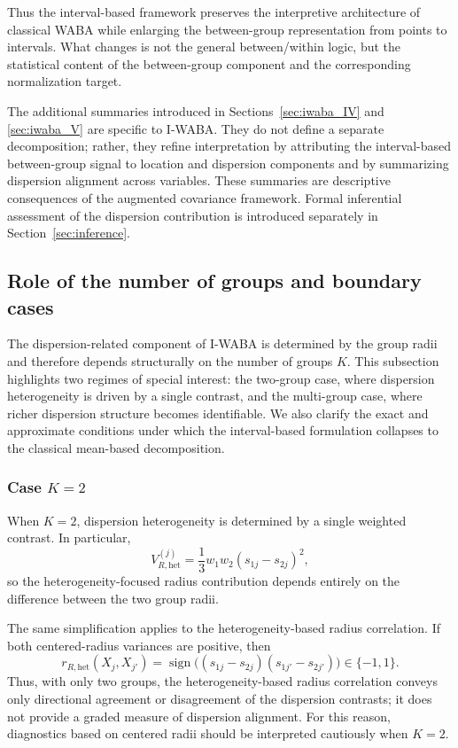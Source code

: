 \documentclass[preprint, times, 12pt, authoryear]{elsarticle}
\begin{document}
 Thus the interval-based framework preserves the interpretive architecture of classical WABA while enlarging the between-group representation from points to intervals. What changes is not the general between/within logic, but the statistical content of the between-group component and the corresponding normalization target.
 
 The additional summaries introduced in Sections~\ref{sec:iwaba_IV} and \ref{sec:iwaba_V} are specific to I-WABA. They do not define a separate decomposition; rather, they refine interpretation by attributing the interval-based between-group signal to location and dispersion components and by summarizing dispersion alignment across variables. These summaries are descriptive consequences of the augmented covariance framework. Formal inferential assessment of the dispersion contribution is introduced separately in Section~\ref{sec:inference}.
 
 
 \subsection{Role of the number of groups and boundary cases}\label{sec:role_of_K}
 
 The dispersion-related component of I-WABA is determined by the group radii and therefore depends structurally on the number of groups $K$. This subsection highlights two regimes of special interest: the two-group case, where dispersion heterogeneity is driven by a single contrast, and the multi-group case, where richer dispersion structure becomes identifiable. We also clarify the exact and approximate conditions under which the interval-based formulation collapses to the classical mean-based decomposition.
 
 \subsubsection{Case $K=2$}
 
 When $K=2$, dispersion heterogeneity is determined by a single weighted contrast. In particular,
 \[
 V_{R,\mathrm{het}}^{(j)}
 =
 \frac{1}{3}w_1w_2(s_{1j}-s_{2j})^2,
 \]
 so the heterogeneity-focused radius contribution depends entirely on the difference between the two group radii.
 
 The same simplification applies to the heterogeneity-based radius correlation. If both centered-radius variances are positive, then
 \[
 r_{R,\mathrm{het}}(X_j,X_{j'})
 =
 \operatorname{sign}\!\big((s_{1j}-s_{2j})(s_{1j'}-s_{2j'})\big)
 \in \{-1,1\}.
 \]
 Thus, with only two groups, the heterogeneity-based radius correlation conveys only directional agreement or disagreement of the dispersion contrasts; it does not provide a graded measure of dispersion alignment. For this reason, diagnostics based on centered radii should be interpreted cautiously when $K=2$.
 
\end{document}
